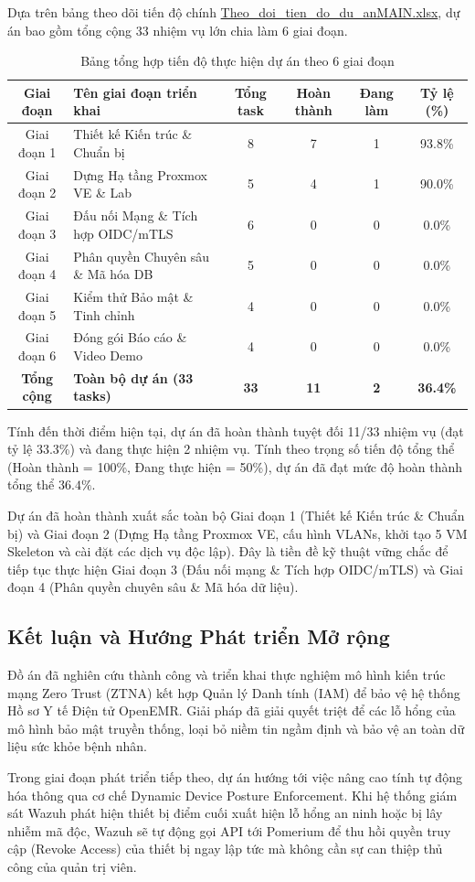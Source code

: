 Dựa trên bảng theo dõi tiến độ chính \url{Theo_doi_tien_do_du_anMAIN.xlsx}, dự án bao gồm tổng cộng 33 nhiệm vụ lớn chia làm 6 giai đoạn.

\begin{table}[H]
\centering
\caption{Bảng tổng hợp tiến độ thực hiện dự án theo 6 giai đoạn}
\label{tab:project_progress}
\begin{tabular}{| c | p{4.5cm} | c | c | c | c |}
\hline
\textbf{Giai đoạn} & \textbf{Tên giai đoạn triển khai} & \textbf{Tổng task} & \textbf{Hoàn thành} & \textbf{Đang làm} & \textbf{Tỷ lệ (\%)} \\ \hline
Giai đoạn 1 & Thiết kế Kiến trúc \& Chuẩn bị & 8 & 7 & 1 & 93.8\% \\ \hline
Giai đoạn 2 & Dựng Hạ tầng Proxmox VE \& Lab & 5 & 4 & 1 & 90.0\% \\ \hline
Giai đoạn 3 & Đấu nối Mạng \& Tích hợp OIDC/mTLS & 6 & 0 & 0 & 0.0\% \\ \hline
Giai đoạn 4 & Phân quyền Chuyên sâu \& Mã hóa DB & 5 & 0 & 0 & 0.0\% \\ \hline
Giai đoạn 5 & Kiểm thử Bảo mật \& Tinh chỉnh & 4 & 0 & 0 & 0.0\% \\ \hline
Giai đoạn 6 & Đóng gói Báo cáo \& Video Demo & 4 & 0 & 0 & 0.0\% \\ \hline
\textbf{Tổng cộng} & \textbf{Toàn bộ dự án (33 tasks)} & \textbf{33} & \textbf{11} & \textbf{2} & \textbf{36.4\%} \\ \hline
\end{tabular}
\end{table}

Tính đến thời điểm hiện tại, dự án đã hoàn thành tuyệt đối 11/33 nhiệm vụ (đạt tỷ lệ 33.3\%) và đang thực hiện 2 nhiệm vụ. Tính theo trọng số tiến độ tổng thể (Hoàn thành = 100\%, Đang thực hiện = 50\%), dự án đã đạt mức độ hoàn thành tổng thể $\mathbf{36.4\%}$.

Dự án đã hoàn thành xuất sắc toàn bộ Giai đoạn 1 (Thiết kế Kiến trúc \& Chuẩn bị) và Giai đoạn 2 (Dựng Hạ tầng Proxmox VE, cấu hình VLANs, khởi tạo 5 VM Skeleton và cài đặt các dịch vụ độc lập). Đây là tiền đề kỹ thuật vững chắc để tiếp tục thực hiện Giai đoạn 3 (Đấu nối mạng \& Tích hợp OIDC/mTLS) và Giai đoạn 4 (Phân quyền chuyên sâu \& Mã hóa dữ liệu).

\subsection{Kết luận và Hướng Phát triển Mở rộng}

Đồ án đã nghiên cứu thành công và triển khai thực nghiệm mô hình kiến trúc mạng Zero Trust (ZTNA) kết hợp Quản lý Danh tính (IAM) để bảo vệ hệ thống Hồ sơ Y tế Điện tử OpenEMR. Giải pháp đã giải quyết triệt để các lỗ hổng của mô hình bảo mật truyền thống, loại bỏ niềm tin ngầm định và bảo vệ an toàn dữ liệu sức khỏe bệnh nhân.

Trong giai đoạn phát triển tiếp theo, dự án hướng tới việc nâng cao tính tự động hóa thông qua cơ chế Dynamic Device Posture Enforcement. Khi hệ thống giám sát Wazuh phát hiện thiết bị điểm cuối xuất hiện lỗ hổng an ninh hoặc bị lây nhiễm mã độc, Wazuh sẽ tự động gọi API tới Pomerium để thu hồi quyền truy cập (Revoke Access) của thiết bị ngay lập tức mà không cần sự can thiệp thủ công của quản trị viên.
